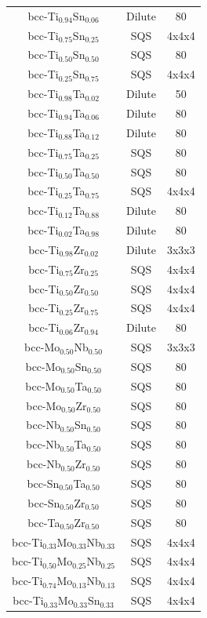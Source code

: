 \begin{longtable}[H]{ c c c }
	bcc-Ti$_{0.94}$Sn$_{0.06}$ & Dilute & 80\\
	bcc-Ti$_{0.75}$Sn$_{0.25}$ & SQS & 4x4x4\\
	bcc-Ti$_{0.50}$Sn$_{0.50}$ & SQS & 80\\
	bcc-Ti$_{0.25}$Sn$_{0.75}$ & SQS & 4x4x4\\
	bcc-Ti$_{0.98}$Ta$_{0.02}$ & Dilute & 50\\
	bcc-Ti$_{0.94}$Ta$_{0.06}$ & Dilute & 80\\
	bcc-Ti$_{0.88}$Ta$_{0.12}$ & Dilute & 80\\
	bcc-Ti$_{0.75}$Ta$_{0.25}$ & SQS & 80\\
	bcc-Ti$_{0.50}$Ta$_{0.50}$ & SQS & 80\\
	bcc-Ti$_{0.25}$Ta$_{0.75}$ & SQS & 4x4x4\\
	bcc-Ti$_{0.12}$Ta$_{0.88}$ & Dilute & 80\\
	bcc-Ti$_{0.02}$Ta$_{0.98}$ & Dilute & 80\\
	bcc-Ti$_{0.98}$Zr$_{0.02}$ & Dilute & 3x3x3\\
	bcc-Ti$_{0.75}$Zr$_{0.25}$ & SQS & 4x4x4\\
	bcc-Ti$_{0.50}$Zr$_{0.50}$ & SQS & 4x4x4\\
	bcc-Ti$_{0.25}$Zr$_{0.75}$ & SQS & 4x4x4\\
	bcc-Ti$_{0.06}$Zr$_{0.94}$ & Dilute & 80\\
	bcc-Mo$_{0.50}$Nb$_{0.50}$ & SQS & 3x3x3\\
	bcc-Mo$_{0.50}$Sn$_{0.50}$ & SQS & 80\\
	bcc-Mo$_{0.50}$Ta$_{0.50}$ & SQS & 80\\
	bcc-Mo$_{0.50}$Zr$_{0.50}$ & SQS & 80\\
	bcc-Nb$_{0.50}$Sn$_{0.50}$ & SQS & 80\\
	bcc-Nb$_{0.50}$Ta$_{0.50}$ & SQS & 80\\
	bcc-Nb$_{0.50}$Zr$_{0.50}$ & SQS & 80\\
	bcc-Sn$_{0.50}$Ta$_{0.50}$ & SQS & 80\\
	bcc-Sn$_{0.50}$Zr$_{0.50}$ & SQS & 80\\
	bcc-Ta$_{0.50}$Zr$_{0.50}$ & SQS & 80\\
	bcc-Ti$_{0.33}$Mo$_{0.33}$Nb$_{0.33}$ & SQS & 4x4x4\\
	bcc-Ti$_{0.50}$Mo$_{0.25}$Nb$_{0.25}$ & SQS & 4x4x4\\
	bcc-Ti$_{0.74}$Mo$_{0.13}$Nb$_{0.13}$ & SQS & 4x4x4\\
	bcc-Ti$_{0.33}$Mo$_{0.33}$Sn$_{0.33}$ & SQS & 4x4x4\\

\end{longtable}
